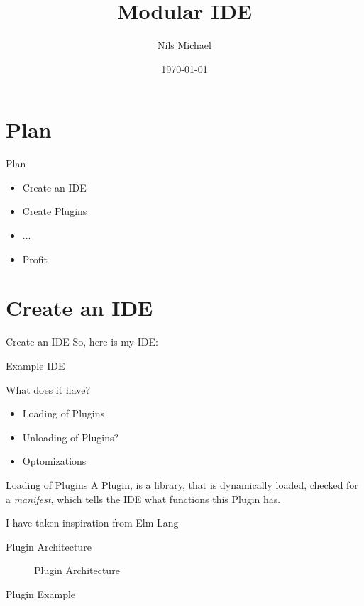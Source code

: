 \documentclass{beamer}
\title{Modular IDE}
\author{Nils Michael}
\date{\today}
\begin{document}
\frame{\titlepage}

\section{Plan}
\begin{frame}{Plan}
    \begin{itemize}
        \item Create an IDE
        \item Create Plugins
        \item ...
        \item Profit
    \end{itemize}
\end{frame}

\section{Create an IDE}
\begin{frame}{Create an IDE}
  So, here is my IDE:
\end{frame}

\begin{frame}{Example IDE}
\end{frame}

\begin{frame}{What does it have?}
  \begin{itemize}
    \item Loading of Plugins
    \item Unloading of Plugins?
    \item \sout{Optomizations}
  \end{itemize}
\end{frame}

\begin{frame}{Loading of Plugins}
  A Plugin, is a library, that is dynamically loaded,
  checked for a \textit{manifest}, which tells the IDE
  what functions this Plugin has.

  I have taken inspiration from Elm-Lang
\end{frame}

\begin{frame}{Plugin Architecture}
    \begin{figure}
        \centering
        
        \caption{Plugin Architecture}
    \end{figure}
\end{frame}

\begin{frame}{Plugin Example}
  
\end{frame}
\end{document}
